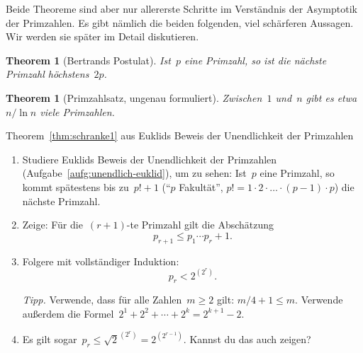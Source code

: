 \documentclass[twoside]{../zirkelblatt1415}
\theoremstyle{definition}
\theoremstyle{plain}
\newtheorem{thm}[defn]{Theorem}
\theoremstyle{remark}
\begin{document}
Beide Theoreme sind aber nur allererste Schritte im Verständnis der Asymptotik
der Primzahlen. Es gibt nämlich die beiden folgenden, viel schärferen Aussagen.
Wir werden sie später im Detail diskutieren.

\begin{thm}[Bertrands Postulat]Ist~$p$ eine Primzahl, so ist die nächste
Primzahl höchstens~$2p$.
\end{thm}

\begin{thm}[Primzahlsatz, ungenau formuliert]Zwischen~$1$ und~$n$ gibt es
etwa~$n/\ln n$ viele Primzahlen.\end{thm}

\begin{aufgabe}{Theorem~\ref{thm:schranke1} aus Euklids Beweis der
Unendlichkeit der Primzahlen}
\begin{enumerate}
\item Studiere Euklids Beweis der Unendlichkeit der Primzahlen
(Aufgabe~\ref{aufg:unendlich-euklid}), um zu sehen: Ist~$p$ eine Primzahl, so
kommt spätestens bis zu~$p! + 1$ ("`$p$ Fakultät"', $p! = 1 \cdot 2 \cdot
\ldots \cdot (p-1) \cdot p$) die nächste Primzahl.
\item Zeige: Für die~$(r+1)$-te Primzahl gilt die Abschätzung
\[ p_{r+1} \leq p_1 \cdots p_r + 1. \]
\item Folgere mit vollständiger Induktion:
\[ p_r < 2^{(2^r)}. \]

\emph{Tipp.} Verwende, dass für alle Zahlen~$m \geq 2$ gilt: $m/4 +
1 \leq m$. Verwende außerdem die Formel~$2^1 + 2^2 + \cdots + 2^k = 2^{k+1} -
2$.
\item Es gilt sogar~$p_r \leq \sqrt{2}^{(2^r)} = 2^{(2^{r-1})}$. Kannst du das
auch zeigen?
\end{enumerate}\fixlistspacing
\end{aufgabe}
\end{document}
